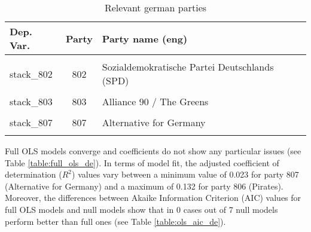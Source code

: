 \documentclass[
]{article}
\begin{document}
\begin{table}[!h]

\caption{\label{tab:unnamed-chunk-72}Relevant german parties \label{table:relprty_tab_de}}
\centering
\begin{tabular}[t]{lcl}
\toprule
Dep. Var. & Party & Party name (eng)\\
\midrule
\cellcolor{gray!6}{stack\_801} & \cellcolor{gray!6}{801} & \cellcolor{gray!6}{Christian Democratic Union / Christian Social Union}\\
stack\_802 & 802 & Sozialdemokratische Partei Deutschlands (SPD)\\
\cellcolor{gray!6}{stack\_805} & \cellcolor{gray!6}{805} & \cellcolor{gray!6}{Free Democratic Party}\\
stack\_803 & 803 & Alliance 90 / The Greens\\
\cellcolor{gray!6}{stack\_804} & \cellcolor{gray!6}{804} & \cellcolor{gray!6}{The Left}\\
\addlinespace
stack\_807 & 807 & Alternative for Germany\\
\cellcolor{gray!6}{stack\_806} & \cellcolor{gray!6}{806} & \cellcolor{gray!6}{Pirates}\\
\bottomrule
\end{tabular}
\end{table}

Full OLS models converge and coefficients do not show any particular issues (see Table
\ref{table:full_ols_de}).
In terms of model fit, the adjusted coefficient of determination (\(R^2\)) values vary between
a minimum value of 0.023
for party 807
(Alternative for Germany)
and a maximum of 0.132
for party 806
(Pirates).
Moreover, the differences between Akaike Information Criterion (AIC) values for full OLS models and null
models show that in 0 cases out of 7 null models perform better than full ones (see Table
\ref{table:ols_aic_de}).
\end{document}
